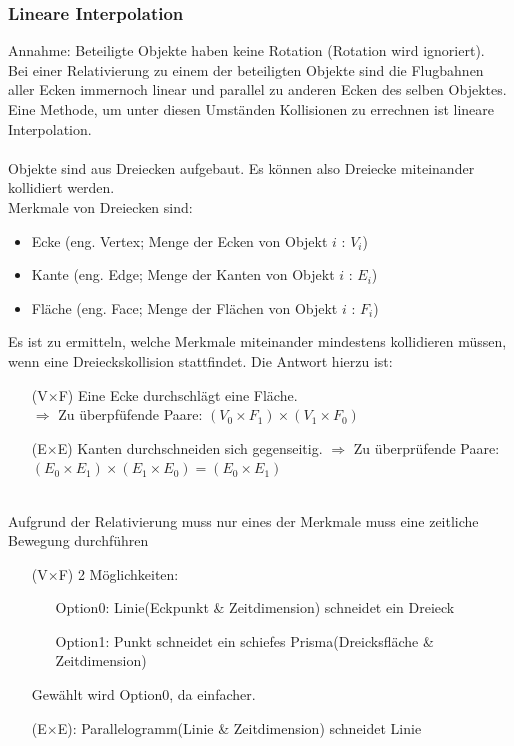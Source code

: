 \subsubsection{Lineare Interpolation}
Annahme: Beteiligte Objekte haben keine Rotation (Rotation wird ignoriert).\\
Bei einer Relativierung zu einem der beteiligten Objekte sind die Flugbahnen aller Ecken immernoch linear und parallel zu anderen Ecken des selben Objektes.\\
Eine Methode, um unter diesen Umständen Kollisionen zu errechnen ist lineare Interpolation.\\
\\
Objekte sind aus Dreiecken aufgebaut. Es können also Dreiecke miteinander kollidiert werden.\\
		Merkmale von Dreiecken sind:
		\begin{itemize}
			\item Ecke (eng. Vertex; Menge der Ecken von Objekt $i$ : $V_i$)
			\item Kante (eng. Edge; Menge der Kanten von Objekt $i$ : $E_i$)
			\item Fläche (eng. Face; Menge der Flächen von Objekt $i$ : $F_i$)
		\end{itemize}
		Es ist zu ermitteln, welche Merkmale miteinander mindestens kollidieren müssen, wenn eine Dreieckskollision stattfindet. Die Antwort hierzu ist:
		\begin{itemize}
			\item [(V$\times$F)] Eine Ecke durchschlägt eine Fläche.\\
				$\Rightarrow$ Zu überpfüfende Paare: $(V_0\times F_1)\times (V_1\times F_0)$
			\item [(E$\times$E)] Kanten durchschneiden sich gegenseitig.
				$\Rightarrow$ Zu überprüfende Paare: $(E_0\times E_1)\times (E_1\times E_0) = (E_0\times E_1)$
		\end{itemize}
\ \\
		Aufgrund der Relativierung muss nur eines der Merkmale muss eine zeitliche Bewegung durchführen
		\begin{itemize}
			\item [(V$\times$F)] 2 Möglichkeiten:
				\begin{itemize}
					\item[Option0:] Linie(Eckpunkt \& Zeitdimension) schneidet ein Dreieck
					\item[Option1:] Punkt schneidet ein schiefes Prisma(Dreicksfläche \& Zeitdimension)
				\end{itemize}
				Gewählt wird Option0, da einfacher.
			\item [(E$\times$E):]  Parallelogramm(Linie \& Zeitdimension) schneidet Linie
		\end{itemize}
